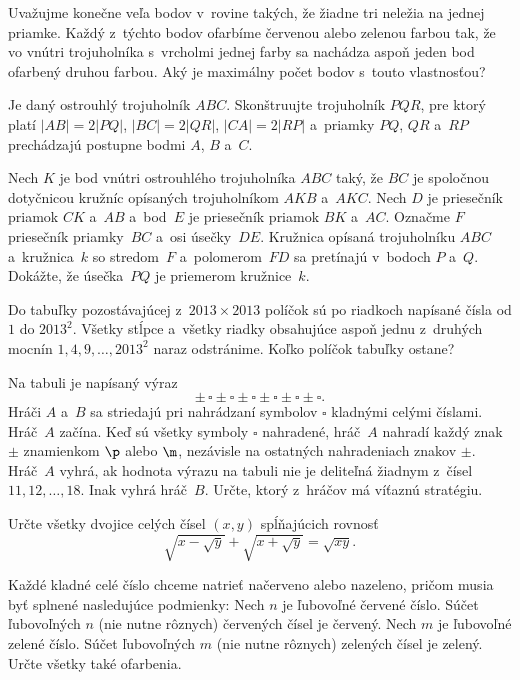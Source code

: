 {%
Uvažujme konečne veľa bodov v~rovine takých, že žiadne tri neležia na jednej priamke. Každý z~týchto bodov ofarbíme červenou alebo zelenou farbou tak, že vo vnútri trojuholníka s~vrcholmi jednej farby sa nachádza aspoň jeden bod ofarbený druhou farbou. Aký je maximálny počet bodov s~touto vlastnosťou?}

{%
Je daný ostrouhlý trojuholník $ABC$. Skonštruujte trojuholník $PQR$, pre ktorý platí $|AB|=2|PQ|$, $|BC|=2|QR|$, $|CA|=2|RP|$ a~priamky $PQ$, $QR$ a~$RP$ prechádzajú postupne bodmi $A$, $B$ a~$C$.%
}

{%
Nech $K$ je bod vnútri ostrouhlého trojuholníka $ABC$ taký, že $BC$ je spoločnou dotyčnicou kružníc opísaných trojuholníkom $AKB$ a~$AKC$. Nech $D$ je priesečník priamok $CK$ a~$AB$ a~bod~$E$ je priesečník priamok $BK$ a~$AC$. Označme $F$ priesečník priamky~$BC$ a~osi úsečky~$DE$. Kružnica opísaná trojuholníku $ABC$ a~kružnica~$k$ so stredom~$F$ a~polomerom~$FD$ sa pretínajú v~bodoch $P$ a~$Q$. Dokážte, že úsečka~$PQ$ je priemerom kružnice~$k$.}

{%
Do tabuľky pozostávajúcej z~$2013\times2013$ políčok sú po riadkoch napísané čísla od $1$ do $2013^2$. Všetky stĺpce a~všetky riadky obsahujúce aspoň jednu z~druhých mocnín $1,4,9,\dots,2013^2$ naraz odstránime. Koľko políčok tabuľky ostane?}

{%
Na tabuli je napísaný výraz
$$
\pm\, \square \pm \square \pm \square \pm \square \pm \square\pm \square.
$$
Hráči $A$ a~$B$ sa striedajú pri nahrádzaní symbolov $\square$ kladnými celými číslami. Hráč~$A$ začína. Keď sú všetky symboly $\square$ nahradené, hráč~$A$ nahradí každý znak $\pm$ znamienkom $\p$ alebo $\m$, nezávisle na ostatných nahradeniach znakov $\pm$. Hráč~$A$ vyhrá, ak hodnota výrazu na tabuli nie je deliteľná žiadnym z~čísel $11,12,\dots,18$. Inak vyhrá hráč~$B$. Určte, ktorý z~hráčov má víťaznú stratégiu.}

{%
Určte všetky dvojice celých čísel $(x,y)$ spĺňajúcich rovnosť
$$
\sqrt{x-\sqrt{y}}+\sqrt{x+\sqrt{y}}=\sqrt{xy}.
$$
}

{%
Každé kladné celé číslo chceme natrieť načerveno alebo nazeleno, pričom musia byť splnené nasledujúce podmienky:
\ite{$\bullet$} Nech $n$ je ľubovoľné červené číslo. Súčet ľubovoľných $n$ (nie nutne rôznych) červených čísel je červený.
\ite{$\bullet$} Nech $m$ je ľubovoľné zelené číslo. Súčet ľubovoľných $m$ (nie nutne rôznych) zelených čísel je zelený.\endgraf
\noindent
Určte všetky také ofarbenia.}

